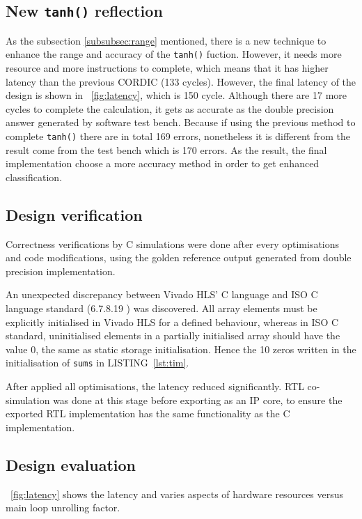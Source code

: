 \documentclass[journal]{IEEEtran}
\newcommand{\fref}[1]{\figurename~\ref{#1}}
\newcommand{\lref}[1]{LISTING~\ref{#1}}
\begin{document}
\subsection{New \texttt{tanh()} reflection}

As the subsection \ref{subsubsec:range} mentioned, there is a new technique to enhance the range and accuracy of the \texttt{tanh()} fuction. However, it needs more resource and more instructions to complete, which means that it has higher latency than the previous CORDIC (133 cycles). However, the final latency of the design is shown in \fref{fig:latency}, which is 150 cycle. Although there are 17 more cycles to complete the calculation, it gets as accurate as the double precision answer generated by software test bench. Because if using the previous method to complete \texttt{tanh()} there are in total 169 errors, nonetheless it is different from the result come from the test bench which is 170 errors. As the result, the final implementation choose a more accuracy method in order to get enhanced classification.

\subsection{Design verification}

Correctness verifications by C simulations were done after every optimisations and code modifications, using the golden reference output generated from double precision implementation.

An unexpected discrepancy between Vivado HLS' C language and ISO C language standard (6.7.8.19 \cite{iso1999iec}) was discovered. All array elements must be explicitly initialised in Vivado HLS for a defined behaviour, whereas in ISO C standard, uninitialised elements in a partially initialised array should have the value 0, the same as static storage initialisation. Hence the 10 zeros written in the initialisation of \texttt{sums} in \lref{lst:tim}.

After applied all optimisations, the latency reduced significantly. RTL co-simulation was done at this stage before exporting as an IP core, to ensure the exported RTL implementation has the same functionality as the C implementation.

\subsection{Design evaluation}

\fref{fig:latency} shows the latency and varies aspects of hardware resources versus main loop unrolling factor.
\end{document}
